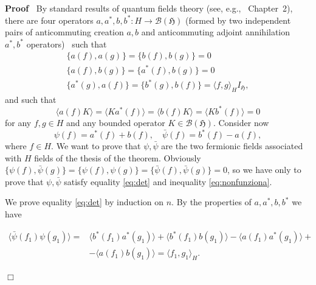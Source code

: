 \documentclass[a4paper,10pt]{article}
\newenvironment{proof}{\noindent\textbf{Proof\ }}{\hspace*{\fill}$\Box$\medskip}
\begin{document}
\begin{proof}
  By standard results of quantum fields theory (see, e.g.,~{\cite{Segal1992}}
  Chapter~2), there are four operators $a, a^{\ast}, b, b^{\ast} : H
  \rightarrow \mathcal{B} (\mathfrak{H})$ (formed by two independent pairs of
  anticommuting creation $a, b$ and anticommuting adjoint annihilation
  $a^{\ast}, b^{\ast}$ operators) \ such that
  \begin{eqnarray}
    & \{ a (f), a (g)^{} \} = \{ b (f), b (g)^{} \} = 0 &  \nonumber\\
    & \{ a (f), b (g)^{} \} = \{ a^{\ast} (f), b (g)^{} \} = 0 &  \nonumber\\
    & \{ a^{\ast} (g), a (f) \} = \{ b^{\ast} (g), b (f) \} = \langle f, g
    \rangle_H I_{\mathfrak{H}}, &  \nonumber
  \end{eqnarray}
  and such that
  \[ \langle a (f) K \rangle = \langle K a^{\ast} (f) \rangle = \langle b (f)
     K \rangle = \langle K b^{\ast} (f) \rangle = 0 \]
  for any $f, g \in H$ and any bounded operator $K \in \mathcal{B}
  (\mathfrak{H})$. Consider now
  \[ \psi (f) = a^{\ast} (f) + b (f), \quad \bar{\psi} (f) = b^{\ast} (f) - a
     (f), \]
  where $f \in H$. We want to prove that $\psi, \bar{\psi}$ are the two
  fermionic fields associated with $H$ fields of the thesis of the theorem.
  Obviously $\{ \psi (f), \bar{\psi} (g) \} = \{ \psi (f), \psi (g) \} = \{
  \bar{\psi} (f), \bar{\psi} (g) \} = 0$, so we have only to prove that $\psi,
  \bar{\psi}$ satisfy equality {\eqref{eq:det}} and inequality
  {\eqref{eq:nonfunziona}}.
  
  We prove equality {\eqref{eq:det}} by induction on $n$. By the properties
  of $a, a^{\ast}, b, b^{\ast}$ we have
  
  \begin{align*}
    \langle \bar{\psi} (f_1) \psi (g_1) \rangle = & \langle b^{\ast} (f_1)
    a^{\ast} (g_1) \rangle + \langle b^{\ast} (f_1) b (g_1) \rangle - \langle
    a (f_1) a^{\ast} (g_1) \rangle +\\
    & - \langle a (f_1) b (g_1) \rangle = \langle f_1, g_1 \rangle_H .
  \end{align*}
  

\end{proof}
\end{document}
